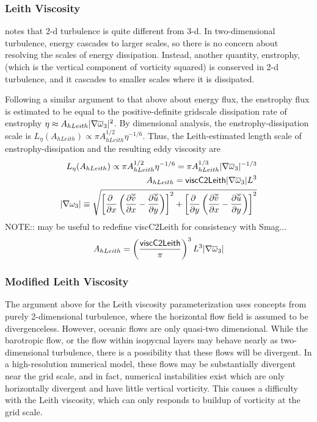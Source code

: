 \subsubsection{Leith Viscosity}
\citet{Leith68,Leith96} notes that 2-d turbulence is quite different
from 3-d.  In two-dimensional turbulence, energy cascades to larger
scales, so there is no concern about resolving the scales of energy
dissipation.  Instead, another quantity, enstrophy, (which is the
vertical component of vorticity squared) is conserved in 2-d
turbulence, and it cascades to smaller scales where it is dissipated.

Following a similar argument to that above about energy flux, the
enstrophy flux is estimated to be equal to the positive-definite
gridscale dissipation rate of enstrophy $\eta\approx A_{hLeith}
|\nabla\overline{\omega}_3|^2$.  By dimensional analysis, the
enstrophy-dissipation scale is $L_\eta(A_{hLeith})\propto\pi
A_{hLeith}^{1/2}\eta^{-1/6}$.  Thus, the Leith-estimated length scale
of enstrophy-dissipation and the resulting eddy viscosity are
\begin{eqnarray}
L_\eta(A_{hLeith})\propto\pi A_{hLeith}^{1/2}\eta^{-1/6}=\pi A_{hLeith}^{1/3}|\nabla \overline{\omega}_3|^{-1/3}\\
A_{hLeith}={\sf viscC2Leith}|\nabla \overline{\omega}_3|L^3\\
|\nabla\omega_3|\equiv\sqrt{\left[{\frac{\partial{\ }}{\partial x}}\left({\frac{\partial{\overline{{\tilde v}}}}{\partial x}}-{\frac{\partial{\overline{{\tilde u}}}}{\partial y}}\right)\right]^2+\left[{\frac{\partial{\ }}{\partial y}}\left({\frac{\partial{\overline{{\tilde v}}}}{\partial x}}-{\frac{\partial{\overline{{\tilde u}}}}{\partial y}}\right)\right]^2}
\end{eqnarray}
NOTE:: may be useful to redefine viscC2Leith for consistency with Smag...
\begin{eqnarray}
A_{hLeith}=\left(\frac{{\sf viscC2Leith}}{\pi}\right)^3L^3|\nabla \overline{\omega}_3|
\end{eqnarray}

\subsubsection{Modified Leith Viscosity}
The argument above for the Leith viscosity parameterization uses
concepts from purely 2-dimensional turbulence, where the horizontal
flow field is assumed to be divergenceless.  However, oceanic flows
are only quasi-two dimensional.  While the barotropic flow, or the
flow within isopycnal layers may behave nearly as two-dimensional
turbulence, there is a possibility that these flows will be divergent.
In a high-resolution numerical model, these flows may be substantially
divergent near the grid scale, and in fact, numerical instabilities
exist which are only horizontally divergent and have little vertical
vorticity.  This causes a difficulty with the Leith viscosity, which
can only responds to buildup of vorticity at the grid scale.

